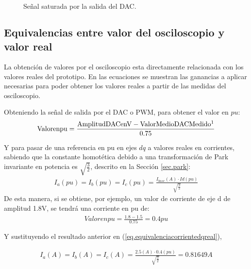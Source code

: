 \documentclass{report}
\begin{document}
\begin{figure}[!h]
    \begin{center}
    \caption{Señal saturada por la salida del DAC.}
    \label{fig.senalsaturada} 
    \end{center}
\end{figure}

\subsection{Equivalencias entre valor del osciloscopio y valor real} \label{sec.equivalenciasosciloscopioreal}

La obtención de valores por el osciloscopio esta directamente relacionada con los valores reales del prototipo. En las ecuaciones se muestran las ganancias a aplicar necesarias para poder obtener los valores reales a partir de las medidas del osciloscopio.


Obteniendo la señal de salida por el DAC o PWM, para obtener el valor en $pu$:
\begin{eqnarray}
 {\rm{Valor en pu}} =  \frac{\rm{Amplitud DAC en V} - \rm{ValorMedioDACMedido}\footnotemark}{0.75} \label{eq.equivalenciadacreal}
\end{eqnarray}

Y para pasar de una referencia en pu en ejes $dq$ a valores reales en corrientes, sabiendo que la constante homotética debido a una transformación de Park invariante en potencia es $\sqrt{\frac{3}{2}}$, descrito en la Sección \ref{sec.park}:
\begin{eqnarray}
    I_{a} (pu) = I_{b} (pu)= I_{c} (pu)= \frac{I_{base}(A) \cdot Id(pu)}{ \sqrt{\frac{3}{2}}} \label{eq.equivalenciacorrientedqreal}
\end{eqnarray}
De esta manera, si se obtiene, por ejemplo, un valor de corriente de eje d de amplitud 1.8V, se tendrá una corriente en pu de:
\begin{eqnarray*}
    {Valor en pu} = \frac{1.8 - 1.5}{0.75} = 0.4 pu
\end{eqnarray*}

Y sustituyendo el resultado anterior en  (\ref{eq.equivalenciacorrientedqreal}),

\begin{eqnarray*}
    I_{a} (A) = I_{b} (A)= I_{c} (A)=  \frac{2.5(A) \cdot 0.4(pu)}{ \sqrt{\frac{3}{2}}}= 0.81649 A
\end{eqnarray*}
\end{document}
